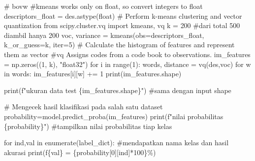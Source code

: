\documentclass[
  letterpaper,
  DIV=11,
  numbers=noendperiod]{scrreprt}
\newenvironment{Shaded}{\begin{snugshade}}{\end{snugshade}}
\newcommand{\BuiltInTok}[1]{\textcolor[rgb]{0.00,0.23,0.31}{#1}}
\newcommand{\CommentTok}[1]{\textcolor[rgb]{0.37,0.37,0.37}{#1}}
\newcommand{\ControlFlowTok}[1]{\textcolor[rgb]{0.00,0.23,0.31}{#1}}
\newcommand{\DecValTok}[1]{\textcolor[rgb]{0.68,0.00,0.00}{#1}}
\newcommand{\ImportTok}[1]{\textcolor[rgb]{0.00,0.46,0.62}{#1}}
\newcommand{\KeywordTok}[1]{\textcolor[rgb]{0.00,0.23,0.31}{#1}}
\newcommand{\NormalTok}[1]{\textcolor[rgb]{0.00,0.23,0.31}{#1}}
\newcommand{\OperatorTok}[1]{\textcolor[rgb]{0.37,0.37,0.37}{#1}}
\newcommand{\SpecialCharTok}[1]{\textcolor[rgb]{0.37,0.37,0.37}{#1}}
\newcommand{\SpecialStringTok}[1]{\textcolor[rgb]{0.13,0.47,0.30}{#1}}
\newcommand{\StringTok}[1]{\textcolor[rgb]{0.13,0.47,0.30}{#1}}
\begin{document}
\begin{Shaded}
\begin{Highlighting}[]
\CommentTok{\# bovw}
\CommentTok{\#kmeans works only on float, so convert integers to float}
\NormalTok{descriptors\_float }\OperatorTok{=}\NormalTok{ des.astype(}\BuiltInTok{float}\NormalTok{)  }
\CommentTok{\# Perform k{-}means clustering and vector quantization}
\ImportTok{from}\NormalTok{ scipy.cluster.vq }\ImportTok{import}\NormalTok{ kmeans, vq}
\NormalTok{k }\OperatorTok{=} \DecValTok{200}  \CommentTok{\#dari total 500 diambil hanya 200}
\NormalTok{voc, variance }\OperatorTok{=}\NormalTok{ kmeans(obs}\OperatorTok{=}\NormalTok{descriptors\_float, k\_or\_guess}\OperatorTok{=}\NormalTok{k, }\BuiltInTok{iter}\OperatorTok{=}\DecValTok{5}\NormalTok{) }
\CommentTok{\# Calculate the histogram of features and represent them as vector}
\CommentTok{\#vq Assigns codes from a code book to observations.}
\NormalTok{im\_features }\OperatorTok{=}\NormalTok{ np.zeros((}\DecValTok{1}\NormalTok{, k), }\StringTok{"float32"}\NormalTok{)}
\ControlFlowTok{for}\NormalTok{ i }\KeywordTok{in} \BuiltInTok{range}\NormalTok{(}\DecValTok{1}\NormalTok{):}
\NormalTok{    words, distance }\OperatorTok{=}\NormalTok{ vq(des,voc)}
    \ControlFlowTok{for}\NormalTok{ w }\KeywordTok{in}\NormalTok{ words:}
\NormalTok{        im\_features[i][w] }\OperatorTok{+=} \DecValTok{1}
\BuiltInTok{print}\NormalTok{(im\_features.shape)}

\BuiltInTok{print}\NormalTok{(}\SpecialStringTok{f"ukuran data test }\SpecialCharTok{\{}\NormalTok{im\_features}\SpecialCharTok{.}\NormalTok{shape}\SpecialCharTok{\}}\SpecialStringTok{"}\NormalTok{) }\CommentTok{\#sama dengan input shape}

\CommentTok{\# Mengecek hasil klasifikasi pada salah satu dataset}
\NormalTok{probability}\OperatorTok{=}\NormalTok{model.predict\_proba(im\_features)}
\BuiltInTok{print}\NormalTok{(}\SpecialStringTok{f"nilai probabilitas }\SpecialCharTok{\{}\NormalTok{probability}\SpecialCharTok{\}}\SpecialStringTok{"}\NormalTok{) }\CommentTok{\#tampilkan nilai probabilitas tiap kelas}



\ControlFlowTok{for}\NormalTok{ ind,val }\KeywordTok{in} \BuiltInTok{enumerate}\NormalTok{(label\_dict): }\CommentTok{\#mendapatkan nama kelas dan hasil akurasi}
    \BuiltInTok{print}\NormalTok{(}\SpecialStringTok{f\textquotesingle{}}\SpecialCharTok{\{}\NormalTok{val}\SpecialCharTok{\}}\SpecialStringTok{ = }\SpecialCharTok{\{}\NormalTok{probability[}\DecValTok{0}\NormalTok{][ind]}\OperatorTok{*}\DecValTok{100}\SpecialCharTok{\}}\SpecialStringTok{\%\textquotesingle{}}\NormalTok{)}
    

\end{Highlighting}
\end{Shaded}
\end{document}
